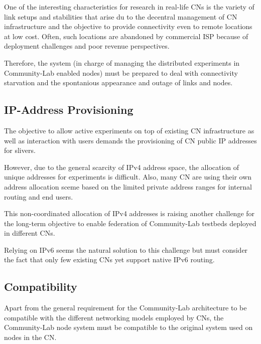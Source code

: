 \documentclass[conference]{IEEEtran}
\begin{document}
One of the interesting characteristics for research in real-life CNs
is the variety of link setups and stabilities that arise du to the
decentral management of CN infrastructure and the objective to provide
connectivity even to remote locations at low cost. Often, such
locations are abandoned by commercial ISP because of deployment
challenges and poor revenue perspectives.

Therefore, the system (in charge of managing the distributed
experiments in Community-Lab enabled nodes) must be prepared to deal with
connectivity starvation and the spontanious appearance and outage of
links and nodes.


\subsection{IP-Address Provisioning}

The objective to allow active experiments on top of existing CN
infrastructure as well as interaction with users demands the
provisioning of CN public IP addresses for slivers.

However, due to the general scarcity of IPv4 address space, the
allocation of unique addresses for experiments is difficult. Also,
many CN are using their own address allocation sceme based on the
limited private address ranges for internal routing and end users.

This non-coordinated allocation of IPv4 addresses is raising another
challenge for the long-term objective to enable federation of Community-Lab
testbeds deployed in different CNs.

Relying on IPv6 seems the natural solution to this challenge but must
consider the fact that only few existing CNs yet support native IPv6
routing.

\subsection{Compatibility}

Apart from the general requirement for the Community-Lab architecture to be
compatible with the different networking models employed by CNs, the
Community-Lab node system must be compatible to the original system used on
nodes in the CN.
\end{document}
